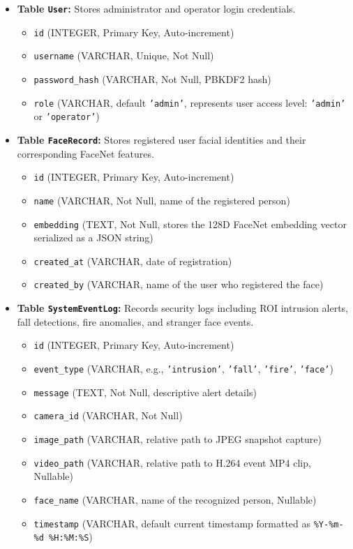 \documentclass[12pt,a4paper]{article}
\begin{document}
\begin{itemize}
    \item \textbf{Table \texttt{User}:} Stores administrator and operator login credentials.
    \begin{itemize}
        \item \texttt{id} (INTEGER, Primary Key, Auto-increment)
        \item \texttt{username} (VARCHAR, Unique, Not Null)
        \item \texttt{password\_hash} (VARCHAR, Not Null, PBKDF2 hash)
        \item \texttt{role} (VARCHAR, default \texttt{'admin'}, represents user access level: \texttt{'admin'} or \texttt{'operator'})
    \end{itemize}
    \item \textbf{Table \texttt{FaceRecord}:} Stores registered user facial identities and their corresponding FaceNet features.
    \begin{itemize}
        \item \texttt{id} (INTEGER, Primary Key, Auto-increment)
        \item \texttt{name} (VARCHAR, Not Null, name of the registered person)
        \item \texttt{embedding} (TEXT, Not Null, stores the 128D FaceNet embedding vector serialized as a JSON string)
        \item \texttt{created\_at} (VARCHAR, date of registration)
        \item \texttt{created\_by} (VARCHAR, name of the user who registered the face)
    \end{itemize}
    \item \textbf{Table \texttt{SystemEventLog}:} Records security logs including ROI intrusion alerts, fall detections, fire anomalies, and stranger face events.
    \begin{itemize}
        \item \texttt{id} (INTEGER, Primary Key, Auto-increment)
        \item \texttt{event\_type} (VARCHAR, e.g., \texttt{'intrusion'}, \texttt{'fall'}, \texttt{'fire'}, \texttt{'face'})
        \item \texttt{message} (TEXT, Not Null, descriptive alert details)
        \item \texttt{camera\_id} (VARCHAR, Not Null)
        \item \texttt{image\_path} (VARCHAR, relative path to JPEG snapshot capture)
        \item \texttt{video\_path} (VARCHAR, relative path to H.264 event MP4 clip, Nullable)
        \item \texttt{face\_name} (VARCHAR, name of the recognized person, Nullable)
        \item \texttt{timestamp} (VARCHAR, default current timestamp formatted as \texttt{\%Y-\%m-\%d \%H:\%M:\%S})
    \end{itemize}
\end{itemize}
\end{document}
